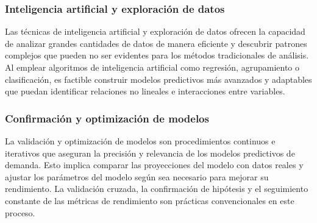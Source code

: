 \subsubsection{Inteligencia artificial y exploración de datos}
Las técnicas de inteligencia artificial y exploración de datos ofrecen la capacidad de analizar grandes cantidades de datos de manera eficiente y descubrir patrones complejos que pueden no ser evidentes para los métodos tradicionales de análisis. Al emplear algoritmos de inteligencia artificial como regresión, agrupamiento o clasificación, es factible construir modelos predictivos más avanzados y adaptables que puedan identificar relaciones no lineales e interacciones entre variables.
\subsubsection{Confirmación y optimización de modelos}
La validación y optimización de modelos son procedimientos continuos e iterativos que aseguran la precisión y relevancia de los modelos predictivos de demanda. Esto implica comparar las proyecciones del modelo con datos reales y ajustar los parámetros del modelo según sea necesario para mejorar su rendimiento. La validación cruzada, la confirmación de hipótesis y el seguimiento constante de las métricas de rendimiento son prácticas convencionales en este proceso.

